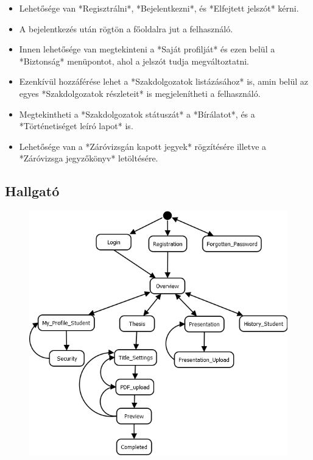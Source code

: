 \documentclass[a4paper,12pt]{article}
\begin{document}
\begin{itemize}
	\item Lehetősége van *Regisztrálni*, *Bejelentkezni*, és *Elfejtett jelszót* kérni. 
	\item A bejelentkezés után rögtön a főoldalra jut a felhasználó. 
	\item Innen lehetősége van megtekinteni a *Saját profilját* és ezen belül a *Biztonság* menüpontot, ahol a jelszót tudja megváltoztatni. 
	\item Ezenkívül hozzáférése lehet a *Szakdolgozatok listázásához* is, amin belül az egyes *Szakdolgozatok részleteit* is megjelenítheti a felhasználó. 
	\item Megtekintheti a *Szakdolgozatok státuszát* a *Bírálatot*, és a *Történetiséget leíró lapot* is. 
	\item Lehetősége van a *Záróvizsgán kapott jegyek* rögzítésére illetve a *Záróvizsga jegyzőkönyv* letöltésére. 
\end{itemize}

\subsection{Hallgató}

\begin{figure}
	\centering
	\includegraphics[width=\textwidth]{images/Lapok_kozotti_atmenetek/Hallgato.png}
	\caption{}
	\label{fig:Hallgato}
\end{figure}
\end{document}
